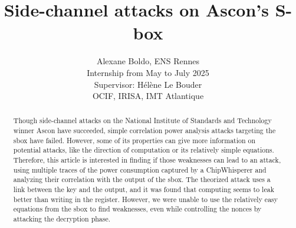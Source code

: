 \documentclass[11pt,technote]{IEEEtran}
\author{
		Alexane Boldo, ENS Rennes\\
		Internship from May to July 2025\\
		Supervisor: Hélène Le Bouder\\
		OCIF, IRISA, IMT Atlantique
	}
\title{Side-channel attacks on Ascon's S-box}
\date{}
\begin{document}
		\maketitle
		
		\begin{abstract}
			Though side-channel attacks on the National Institute of Standards and Technology winner Ascon have succeeded, simple correlation power analysis attacks targeting the \ac{sbox} have failed. However, some of its properties can give more information on potential attacks, like the direction of computation or its relatively simple equations. Therefore, this article is interested in finding if those weaknesses can lead to an attack, using multiple traces of the power consumption captured by a ChipWhisperer and analyzing their correlation with the output of the \ac{sbox}. The theorized attack uses a link between the key and the output, and it was found that computing seems to leak better than writing in the register. However, we were unable to use the relatively easy equations from the \ac{sbox} to find weaknesses, even while controlling the nonces by attacking the decryption phase.
		\end{abstract}
		
		
\end{document}
